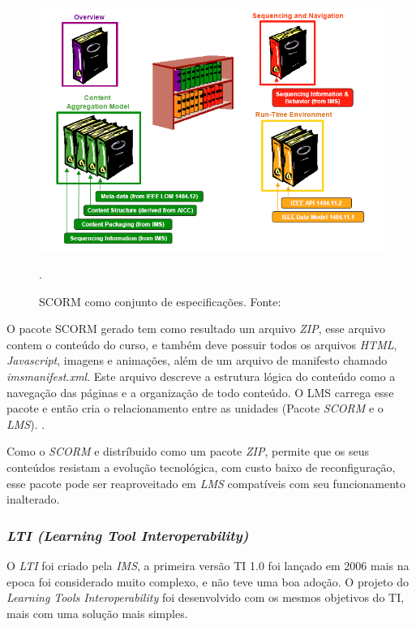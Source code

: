 \begin{figure}[h]
  \centering
  \includegraphics[keepaspectratio=true,scale=0.7]{figuras/scorm-funcionamento-dutra.png}
  \caption{SCORM como conjunto de especificações. Fonte: }.
  \label{fig:scorm-funcionamento-dutra}
\end{figure}

O pacote \ac{SCORM} gerado tem como resultado um arquivo \textit{ZIP}, esse arquivo contem o conteúdo do curso, e também deve possuir todos os arquivos \textit{HTML}, \textit{Javascript}, imagens e animações, além de um arquivo de manifesto chamado \textit{imsmanifest.xml}. Este arquivo descreve a estrutura lógica do conteúdo como a navegação das páginas e a organização de todo conteúdo. O \ac{LMS} carrega esse pacote e então cria o relacionamento entre as unidades (Pacote \textit{SCORM} e o \textit{LMS}). \cite[p.~39]{fernandes-scorm}.

Como o \textit{SCORM} e distríbuido como um pacote \textit{ZIP}, permite que os seus conteúdos resistam a evolução tecnológica, com custo baixo de reconfiguração, esse pacote pode ser reaproveitado em \textit{LMS} compatíveis com seu funcionamento inalterado.

\subsubsection{\textit{LTI (Learning Tool Interoperability)}}
O \textit{LTI} foi criado pela \textit{IMS}, a primeira versão TI 1.0 foi lançado em 2006 mais na epoca foi considerado muito complexo, e não teve uma boa adoção. O projeto do \textit{Learning Tools Interoperability} foi desenvolvido com os mesmos objetivos do TI, mais com uma solução mais simples. \cite{ims}

